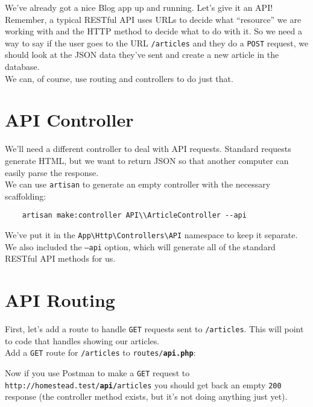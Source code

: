 We've already got a nice Blog app up and running. Let's give it an API!
\\

Remember, a typical RESTful API uses URLs to decide what ``resource'' we are working with and the HTTP method to decide what to do with it. So we need a way to say if the user goes to the URL \texttt{/articles} and they do a \texttt{POST} request, we should look at the JSON data they've sent and create a new article in the database.
\\

We can, of course, use routing and controllers to do just that.

\section{API Controller}

We'll need a different controller to deal with API requests. Standard requests generate HTML, but we want to return JSON so that another computer can easily parse the response.
\\

We can use \texttt{artisan} to generate an empty controller with the necessary scaffolding:

\begin{verbatim}
    artisan make:controller API\\ArticleController --api
\end{verbatim}

We've put it in the \texttt{App\textbackslash{}Http\textbackslash{}Controllers\textbackslash{}API} namespace to keep it separate. We also included the \texttt{--api} option, which will generate all of the standard RESTful API methods for us.


\section{API Routing}

First, let's add a route to handle \texttt{GET} requests sent to \texttt{/articles}. This will point to code that handles showing our articles.
\\

Add a \texttt{GET} route for \texttt{/articles} to \texttt{routes/\textbf{api.php}}:


Now if you use Postman to make a \texttt{GET} request to \texttt{http://homestead.test/\textbf{api/}articles} you should get back an empty \texttt{200} response (the controller method exists, but it's not doing anything just yet).
\\

